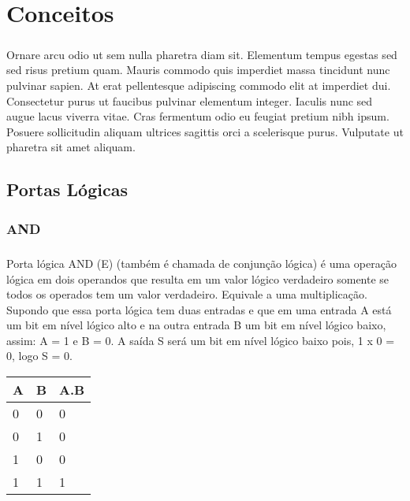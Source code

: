 \chapter{Conceitos}

\paragraph{}
Ornare arcu odio ut sem nulla pharetra diam sit. Elementum tempus egestas sed sed risus pretium quam. Mauris commodo quis imperdiet massa tincidunt nunc pulvinar sapien. At erat pellentesque adipiscing commodo elit at imperdiet dui. Consectetur purus ut faucibus pulvinar elementum integer. Iaculis nunc sed augue lacus viverra vitae. Cras fermentum odio eu feugiat pretium nibh ipsum. Posuere sollicitudin aliquam ultrices sagittis orci a scelerisque purus. Vulputate ut pharetra sit amet aliquam.

\section{Portas Lógicas}

\subsection{AND}

\paragraph{}
Porta lógica AND (E) (também é chamada de conjunção lógica) é uma operação lógica em dois operandos que resulta em um valor lógico verdadeiro somente se todos os operados tem um valor verdadeiro. Equivale a uma multiplicação. Supondo que essa porta lógica tem duas entradas e que em uma entrada A está um bit em nível lógico alto e na outra entrada B um bit em nível lógico baixo, assim: A = 1 e B = 0. A saída S será um bit em nível lógico baixo pois, 1 x 0 = 0, logo S = 0.

\begin{table}[h]
    \centering
    \begin{tabular}{|l|l|l|}
    \hline
    \rowcolor[HTML]{EFEFEF} 
    A & B & A.B \\ \hline
    0 & 0 & 0   \\ \hline
    0 & 1 & 0   \\ \hline
    1 & 0 & 0   \\ \hline
    1 & 1 & 1   \\ \hline
    \end{tabular}
\end{table}

